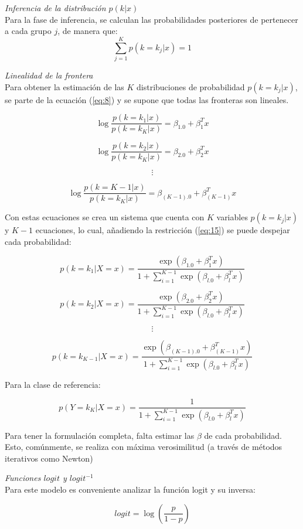 \textit{Inferencia de la distribución $p(k | x)$} \\
Para la fase de inferencia, se calculan las probabilidades posteriores de pertenecer a cada grupo $j$, de manera que: 
\begin{equation} \label{eq:15}
	\sum\limits_{j = 1}^{K} p(k = k_j | x) = 1
\end{equation}


\textit{Linealidad de la frontera}\\
Para obtener la estimación de las $K$ distribuciones de probabilidad $p(k = k_j | x)$, se parte de la ecuación (\ref{eq:8}) y se supone que todas las fronteras son lineales.

$$ \log \frac{p(k = k_1 | x)}{p(k = k_K | x)} = \beta_{1.0} + \beta_1^T x$$

$$ \log \frac{p(k = k_2 | x)}{p(k = k_K | x)} = \beta_{2.0} + \beta_2^T x$$

$$\vdots$$

$$ \log \frac{p(k = K-1 | x)}{p(k = k_K | x)} = \beta_{(K-1).0} + \beta_{(K-1)}^T x$$

Con estas ecuaciones se crea un sistema que cuenta con $K$ variables $p(k = k_j| x)$ y $K-1$ ecuaciones, lo cual, añadiendo la restricción (\ref{eq:15}) se puede despejar cada probabilidad: 

$$ p(k = k_1 | X = x) = \frac{\exp(\beta_{1.0} + \beta_1^T x)}{1+\sum\limits_{i=1}^{K-1} {\exp(\beta_{l.0} + \beta_l^T x)}} $$

$$ p(k = k_2 | X = x) = \frac{\exp(\beta_{2.0} + \beta_2^T x)}{1+\sum\limits_{i=1}^{K-1} {\exp(\beta_{l.0} + \beta_l^T x)}} $$

$$ \vdots $$

$$ p(k = k_{K-1} | X = x) = \frac{\exp(\beta_{(K-1).0} + \beta_{(K-1)}^T x)}{1+\sum\limits_{i=1}^{K-1} {\exp(\beta_{l.0} + \beta_l^T x)}} $$

Para la clase de referencia: 

$$ p(Y = k_K | X = x) = \frac{1}{1+\sum\limits_{i=1}^{K-1} {\exp(\beta_{l.0} + \beta_l^T x)}} $$

Para tener la formulación completa, falta estimar las $\beta$ de cada probabilidad. Esto, comúnmente, se realiza con máxima verosimilitud (a través de métodos iterativos como Newton) \cite{hastie2009elements}


\textit{Funciones $logit$ y $logit^{-1}$} \\
Para este modelo es conveniente analizar la función logit y su inversa:
 
 \begin{equation} \label{eq:16}
 logit = \log (\frac{p}{1-p}) 
 \end{equation}

